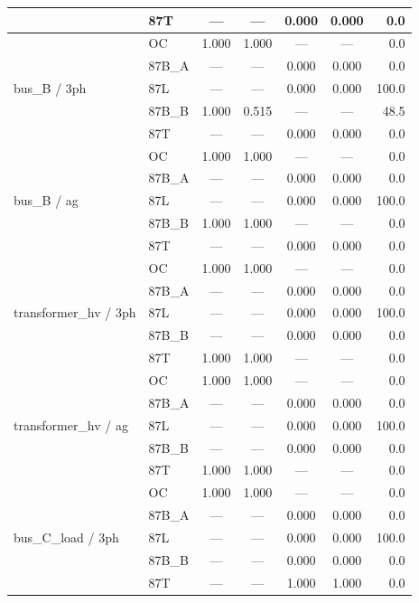 \documentclass[12pt,a4paper]{article}
\begin{document}
\begin{table}[ht]
\begin{tabular}{llccccr}
  & 87T     & ---   & ---   & 0.000 & 0.000 & 0.0 \\
\midrule
\multirow{5}{*}{bus\_B / 3ph}
  & OC      & 1.000 & 1.000 & ---   & ---   & 0.0 \\
  & 87B\_A  & ---   & ---   & 0.000 & 0.000 & 0.0 \\
  & 87L     & ---   & ---   & 0.000 & 0.000 & 100.0 \\
  & 87B\_B  & 1.000 & \textcolor{warnorange}{0.515} & ---   & ---   & 48.5 \\
  & 87T     & ---   & ---   & 0.000 & 0.000 & 0.0 \\
\midrule
\multirow{5}{*}{bus\_B / ag}
  & OC      & 1.000 & 1.000 & ---   & ---   & 0.0 \\
  & 87B\_A  & ---   & ---   & 0.000 & 0.000 & 0.0 \\
  & 87L     & ---   & ---   & 0.000 & 0.000 & 100.0 \\
  & 87B\_B  & 1.000 & 1.000 & ---   & ---   & 0.0 \\
  & 87T     & ---   & ---   & 0.000 & 0.000 & 0.0 \\
\midrule
\multirow{5}{*}{transformer\_hv / 3ph}
  & OC      & 1.000 & 1.000 & ---   & ---   & 0.0 \\
  & 87B\_A  & ---   & ---   & 0.000 & 0.000 & 0.0 \\
  & 87L     & ---   & ---   & 0.000 & 0.000 & 100.0 \\
  & 87B\_B  & ---   & ---   & 0.000 & 0.000 & 0.0 \\
  & 87T     & 1.000 & 1.000 & ---   & ---   & 0.0 \\
\midrule
\multirow{5}{*}{transformer\_hv / ag}
  & OC      & 1.000 & 1.000 & ---   & ---   & 0.0 \\
  & 87B\_A  & ---   & ---   & 0.000 & 0.000 & 0.0 \\
  & 87L     & ---   & ---   & 0.000 & 0.000 & 100.0 \\
  & 87B\_B  & ---   & ---   & 0.000 & 0.000 & 0.0 \\
  & 87T     & 1.000 & 1.000 & ---   & ---   & 0.0 \\
\midrule
\multirow{5}{*}{bus\_C\_load / 3ph}
  & OC      & 1.000 & 1.000 & ---   & ---   & 0.0 \\
  & 87B\_A  & ---   & ---   & 0.000 & 0.000 & 0.0 \\
  & 87L     & ---   & ---   & 0.000 & 0.000 & 100.0 \\
  & 87B\_B  & ---   & ---   & 0.000 & 0.000 & 0.0 \\
  & 87T     & ---   & ---   & \textcolor{warnred}{1.000} & \textcolor{warnred}{1.000} & 0.0 \\

\end{tabular}
\end{table}
\end{document}
